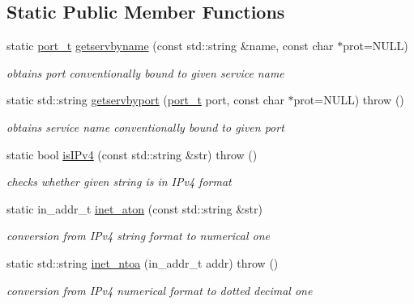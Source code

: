 \subsection*{Static Public Member Functions}
\begin{CompactItemize}
\item 
static \hyperlink{namespacesocketpp_5517ef80f249b891a2ba64b95fc1e723}{port\_\-t} \hyperlink{classsocketpp_1_1AddrHandler_b4a42f2b0f3842d681ea0cbe6810d6ff}{getservbyname} (const std::string \&name, const char $\ast$prot=NULL)
\begin{CompactList}\small\item\em obtains port conventionally bound to given service name \item\end{CompactList}\item 
static std::string \hyperlink{classsocketpp_1_1AddrHandler_f221cac56bf3808494806d335a56bb87}{getservbyport} (\hyperlink{namespacesocketpp_5517ef80f249b891a2ba64b95fc1e723}{port\_\-t} port, const char $\ast$prot=NULL)  throw ()
\begin{CompactList}\small\item\em obtains service name conventionally bound to given port \item\end{CompactList}\item 
static bool \hyperlink{classsocketpp_1_1AddrHandler_652e24c273f7905cebf8d04b3cfef74d}{isIPv4} (const std::string \&str)  throw ()
\begin{CompactList}\small\item\em checks whether given string is in IPv4 format \item\end{CompactList}\item 
static in\_\-addr\_\-t \hyperlink{classsocketpp_1_1AddrHandler_e2eda37cd4c20059c557e4e65c829cf8}{inet\_\-aton} (const std::string \&str)
\begin{CompactList}\small\item\em conversion from IPv4 string format to numerical one \item\end{CompactList}\item 
static std::string \hyperlink{classsocketpp_1_1AddrHandler_a4377d84c8ea976aeada2b2eb0ac248d}{inet\_\-ntoa} (in\_\-addr\_\-t addr)  throw ()
\begin{CompactList}\small\item\em conversion from IPv4 numerical format to dotted decimal one \item\end{CompactList}\end{CompactItemize}


